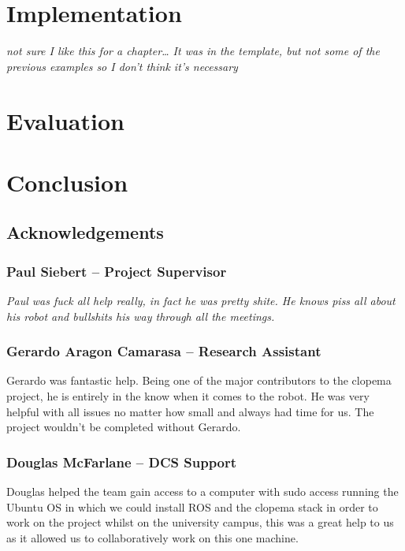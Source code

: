 \documentclass{l3proj}
\begin{document}
\chapter{Implementation}
\textit {not sure I like this for a chapter… It was in the template, but not some of the previous examples so I don’t think it’s necessary} 

\chapter{Evaluation}
%
\chapter{Conclusion}
%
\section{Acknowledgements}
\subsection*{Paul Siebert -- Project Supervisor}
\textit {Paul was fuck all help really, in fact he was pretty shite. He knows piss all about his robot and bullshits his way through all the meetings.} 
\subsection*{Gerardo Aragon Camarasa -- Research Assistant}
Gerardo was fantastic help. Being one of the major contributors to the \gls{clopema} project, he is entirely in the know when it comes to the robot. He was very helpful with all issues no matter how small and always had time for us. The project wouldn't be completed without Gerardo.
\subsection*{Douglas McFarlane -- DCS Support}
Douglas helped the team gain access to a computer with sudo access running the Ubuntu OS in which we could install ROS and the \gls{clopema} stack in order to work on the project whilst on the university campus, this was a great help to us as it allowed us to collaboratively work on this one machine.


%
\end{document}
